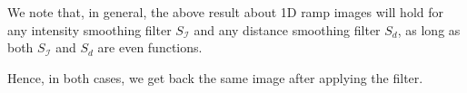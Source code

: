 \documentclass[a4paper]{article}
\begin{document}
\begin{enumerate}
We note that, in general, the above result about 1D ramp images will hold for any intensity smoothing filter $S_\mathcal{I}$ and any distance smoothing filter $S_d$, as long as both $S_\mathcal{I}$ and $S_d$ are even functions.
\end{enumerate}
Hence, in both cases, we get back the same image after applying the filter.
\end{document}
